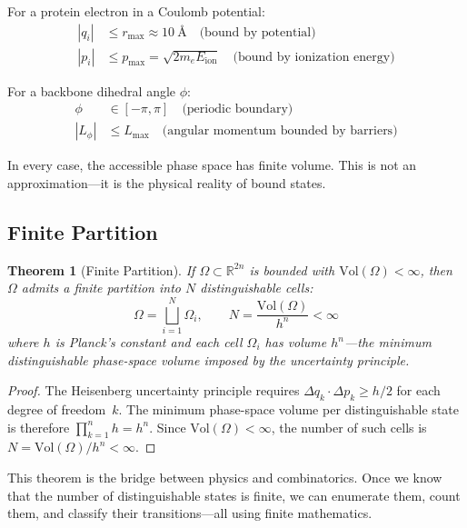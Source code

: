 \documentclass[aps,prx,superscriptaddress,twocolumn,10pt,a4paper,longbibliography,preprint]{revtex4-2}
\newtheorem{theorem}{Theorem}[section]
\theoremstyle{definition}
\theoremstyle{remark}
\begin{document}
For a protein electron in a Coulomb potential:
\begin{align}
|q_i| &\leq r_{\max} \approx 10~\text{\AA} \quad \text{(bound by potential)} \\
|p_i| &\leq p_{\max} = \sqrt{2m_e E_{\text{ion}}} \quad \text{(bound by ionization energy)}
\end{align}

For a backbone dihedral angle $\phi$:
\begin{align}
\phi &\in [-\pi, \pi] \quad \text{(periodic boundary)} \\
|L_\phi| &\leq L_{\max} \quad \text{(angular momentum bounded by barriers)}
\end{align}

In every case, the accessible phase space has finite volume. This is not an approximation---it is the physical reality of bound states.

\subsection{Finite Partition}

\begin{theorem}[Finite Partition]
\label{thm:finite_partition}
If $\Omega \subset \mathbb{R}^{2n}$ is bounded with $\mathrm{Vol}(\Omega) < \infty$, then $\Omega$ admits a finite partition into $N$ distinguishable cells:
\begin{equation}
\Omega = \bigsqcup_{i=1}^{N} \Omega_i, \qquad N = \frac{\mathrm{Vol}(\Omega)}{h^n} < \infty
\label{eq:partition}
\end{equation}
where $h$ is Planck's constant and each cell $\Omega_i$ has volume $h^n$---the minimum distinguishable phase-space volume imposed by the uncertainty principle.
\end{theorem}

\begin{proof}
The Heisenberg uncertainty principle requires $\Delta q_k \cdot \Delta p_k \geq h/2$ for each degree of freedom~$k$. The minimum phase-space volume per distinguishable state is therefore $\prod_{k=1}^{n} h = h^n$. Since $\mathrm{Vol}(\Omega) < \infty$, the number of such cells is $N = \mathrm{Vol}(\Omega)/h^n < \infty$.
\end{proof}

This theorem is the bridge between physics and combinatorics. Once we know that the number of distinguishable states is finite, we can enumerate them, count them, and classify their transitions---all using finite mathematics.
\end{document}
